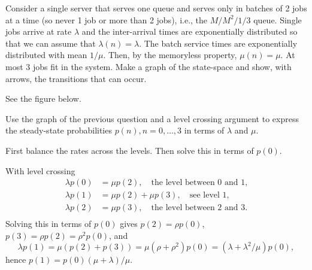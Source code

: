 \begin{exercise}
  Consider a single server that serves one queue and serves only in
  batches of 2 jobs at a time (so never 1 job or more than 2 jobs),
  i.e., the $M/M^2/1/3$ queue.  Single jobs arrive at rate $\lambda$
  and the inter-arrival times are exponentially distributed so that we can assume that $\lambda(n) = \lambda$. The batch service times are exponentially distributed with mean $1/\mu$. Then, by the memoryless property, $\mu(n) = \mu$. At most 3 jobs fit in the system.   Make a graph of the state-space and show, with arrows, the
  transitions that can occur.

  \begin{solution}
See the figure below.

  \end{solution}
\end{exercise}

\begin{exercise}
  Use the graph of the previous question and a level crossing argument
  to express the steady-state probabilities $p(n), n=0,\ldots, 3$ in
  terms of $\lambda$ and $\mu$.
  \begin{hint}
First balance the rates across the levels. Then solve this in terms of $p(0)$.
  \end{hint}
  \begin{solution}
With level crossing
  \begin{align*}
    \lambda p(0)  &= \mu p(2), \quad\text{the level between 0 and 1,}\\
    \lambda p(1)  &= \mu p(2) +\mu p(3), \quad\text{see level 1,}\\
    \lambda p(2)  &= \mu p(3), \quad\text{the level between 2 and 3.}\\
  \end{align*}
  Solving this in terms of $p(0)$ gives $p(2) = \rho p(0)$, $p(3) = \rho p(2) = \rho^2p(0)$, and
  \begin{equation*}
    \lambda p(1) = \mu(p(2) + p(3)) = \mu (\rho + \rho^2) p(0) = (\lambda + \lambda^2/\mu) p(0),
  \end{equation*}
hence $p(1) = p(0)(\mu + \lambda)/\mu$. 
  \end{solution}
\end{exercise}

